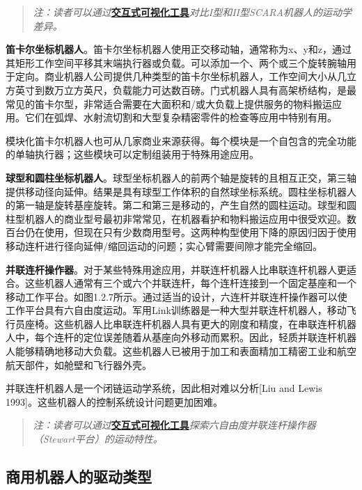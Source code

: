 \documentclass[UTF8,a4paper]{ctexart}
\begin{document}
\begin{quote}
\textit{注：读者可以通过}\href{https://frankjie09.github.io/Robot-Manipulator-Control-CN/figures/SCARA/SCARA_Type_I_vs_II_Comparison.html}{\textbf{交互式可视化工具}}\textit{对比I型和II型SCARA机器人的运动学差异。}
\end{quote}

\textbf{笛卡尔坐标机器人}。笛卡尔坐标机器人使用正交移动轴，通常称为x、y和z，通过其矩形工作空间平移其末端执行器或负载。可以添加一个、两个或三个旋转腕轴用于定向。商业机器人公司提供几种类型的笛卡尔坐标机器人，工作空间大小从几立方英寸到数万立方英尺，负载能力可达数百磅。门式机器人具有高架桥结构，是最常见的笛卡尔型，非常适合需要在大面积和/或大负载上提供服务的物料搬运应用。它们在弧焊、水射流切割和大型复杂精密零件的检查等应用中特别有用。

模块化笛卡尔机器人也可从几家商业来源获得。每个模块是一个自包含的完全功能的单轴执行器；这些模块可以定制组装用于特殊用途应用。

\textbf{球型和圆柱坐标机器人}。球型坐标机器人的前两个轴是旋转的且相互正交，第三轴提供移动径向延伸。结果是具有球型工作体积的自然球坐标系统。圆柱坐标机器人的第一轴是旋转基座旋转。第二和第三是移动的，产生自然的圆柱运动。球型和圆柱型机器人的商业型号最初非常常见，在机器看护和物料搬运应用中很受欢迎。数百台仍在使用，但现在只有少数商用型号。这两种构型使用下降的原因归因于使用移动连杆进行径向延伸/缩回运动的问题；实心臂需要间隙才能完全缩回。

\textbf{并联连杆操作器}。对于某些特殊用途应用，并联连杆机器人比串联连杆机器人更适合。这些机器人通常有三个或六个并联连杆，每个连杆连接到一个固定基座和一个移动工作平台。如图1.2.7所示。通过适当的设计，六连杆并联连杆操作器可以使工作平台具有六自由度运动。军用Link训练器是一种大型并联连杆机器人，移动飞行员座椅。这些机器人比串联连杆机器人具有更大的刚度和精度，在串联连杆机器人中，每个连杆的定位误差随着从基座向外移动而累积。因此，轻质并联连杆机器人能够精确地移动大负载。这些机器人已被用于加工和表面精加工精密工业和航空航天部件，如舱壁和飞行器外壳。

并联连杆机器人是一个闭链运动学系统，因此相对难以分析[Liu and Lewis 1993]。这些机器人的控制系统设计问题更加困难。

\begin{quote}
\textit{注：读者可以通过}\href{https://frankjie09.github.io/Robot-Manipulator-Control-CN/figures/Parallel_Link/Parallel_Link_Manipulator.html}{\textbf{交互式可视化工具}}\textit{探索六自由度并联连杆操作器（Stewart平台）的运动特性。}
\end{quote}

\subsection{商用机器人的驱动类型}
\end{document}
